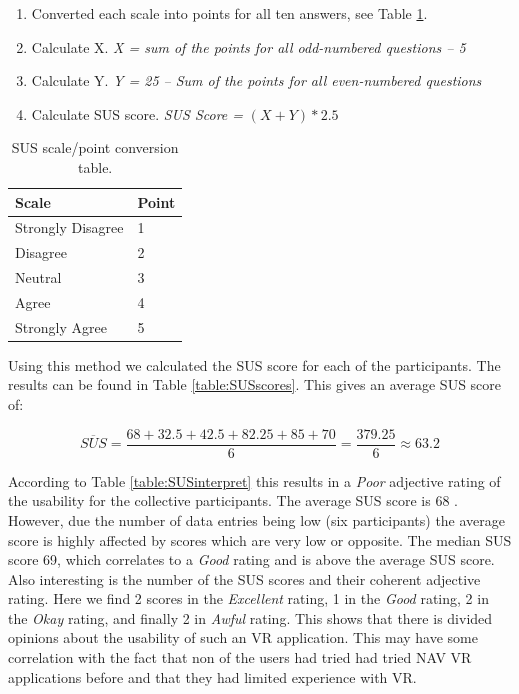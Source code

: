 \begin{enumerate}
  \item Converted each scale into points for all ten answers, see Table \ref{table:SUSconversionPoints}. 
  \item Calculate X. \textit{X = sum of the points for all odd-numbered questions – 5}  
  \item Calculate Y. \textit{Y =  25 – Sum of the points for all even-numbered questions}
  \item Calculate SUS score. \textit{SUS Score =} $(X + Y) * 2.5$ 
\end{enumerate}


\begin{table}[H]
\centering
\begin{tabular}{l|l}
{ \textbf{Scale}} & { \textbf{Point}} \\ \hline
Strongly Disagree                     & 1                                     \\ 
Disagree                              & 2                                     \\ 
Neutral                               & 3                                     \\ 
Agree                                 & 4                                     \\ 
Strongly Agree                        & 5                                     \\ 
\end{tabular}
\caption{SUS scale/point conversion table.}
\label{table:SUSconversionPoints}
\end{table}

Using this method we calculated the SUS score for each of the participants. The results can be found in Table \ref{table:SUSscores}. This gives an average SUS score of: 

\[\overline{SUS} = \frac{68 + 32.5 + 42.5 + 82.25 + 85 + 70}{6} = \frac{379.25}{6} \approx 63.2\]

According to Table \ref{table:SUSinterpret} this results in a \textit{Poor} adjective rating of the usability for the collective participants. The average SUS score is 68 \cite{SusMeasuringInterpret}. However, due the number of data entries being low (six participants) the average score is highly affected by scores which are very low or opposite. The median SUS score 69, which correlates to a \textit{Good} rating and is above the average SUS score. Also interesting is the number of the SUS scores and their coherent adjective rating. Here we find 2 scores in the \textit{Excellent} rating, 1 in the \textit{Good} rating, 2 in the \textit{Okay} rating, and finally 2 in \textit{Awful} rating. This shows that there is divided opinions about the usability of such an VR application. This may have some correlation with the fact that non of the users had tried had tried NAV VR applications before and that they had limited experience with VR. 




